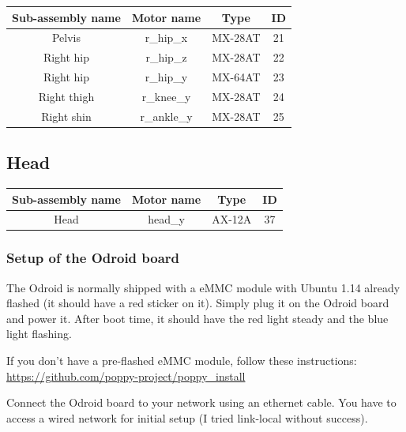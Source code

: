 \documentclass{article}
\begin{document}
\begin{center}

\begin{tabular}{|c|c|c|c|}
\hline 
Sub-assembly name & Motor name & Type & ID \\ 
\hline 
Pelvis & r\_hip\_x & MX-28AT & 21 \\ 
\hline 
Right hip & r\_hip\_z & MX-28AT & 22 \\ 
\hline 
Right hip & r\_hip\_y & MX-64AT & 23 \\ 
\hline 
Right thigh & r\_knee\_y & MX-28AT & 24 \\ 
\hline 
Right shin & r\_ankle\_y & MX-28AT & 25\\
\hline 
\end{tabular} 
\end{center}


\subsection{Head} 
 \label{head-assembly}


\begin{center}

\begin{tabular}{|c|c|c|c|}
\hline 
Sub-assembly name & Motor name & Type & ID \\ 
\hline 

Head & head\_y & AX-12A & 37 \\ 
\hline 
\end{tabular} 
\end{center}

\subsubsection{Setup of the Odroid board}


The Odroid is normally shipped with a eMMC module with Ubuntu 1.14 already flashed (it should have a red sticker on it). Simply plug it on the Odroid board and power it. After boot time, it should have the red light steady and the blue light flashing.

If you don't have a pre-flashed eMMC module, follow these instructions: \url{https://github.com/poppy-project/poppy_install}

\vspace{3mm} Connect the Odroid board to your network using an ethernet cable. You have to access a wired network for initial setup (I tried link-local without success).
\end{document}
